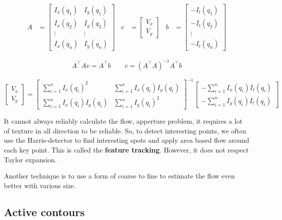 \documentclass[
  a4paper,
  ,captions=tableheading
]{scrartcl}
\begin{document}
\begin{align}
    A &= \begin{bmatrix}
        I_x(q_1) & I_y(q_1)\\
        I_x(q_2) & I_y(q_2)\\
        \vdots & \vdots\\
        I_x(q_n) & I_y(q_n)
    \end{bmatrix} & v&= \begin{bmatrix}
        V_x\\ V_y
    \end{bmatrix} & b&=\begin{bmatrix}
        -I_t(q_1)\\
        -I_t(q_2)\\
        \vdots\\
        -I_t(q_n)
    \end{bmatrix}
\end{align}

\[
A^\top A v = A^\top b \qquad v = (A^\top A)^{-1} A^\top b
\]

\[
\begin{bmatrix}
    V_x\\
    V_y
\end{bmatrix} = \begin{bmatrix}
    \sum_{i=1}^n I_x(q_i)^2 & \sum_{i=1}^n I_x(q_i) I_y(q_i)\\
    \sum_{i=1}^n I_x(q_i) I_y(q_i) & \sum_{i=1}^n I_y(q_i)^2
\end{bmatrix}^{-1} \begin{bmatrix}
    -\sum_{i=1}^n I_x(q_i) I_t(q_i)\\
    -\sum_{i=1}^n I_y(q_i) I_t(q_i)
\end{bmatrix}
\]

It cannot always reliably calculate the flow, apperture problem, it
requires a lot of texture in all direction to be reliable. So, to detect
interesting points, we often use the Harris-detector to find interesting
spots and apply area based flow around each key point. This is called
the \textbf{feature tracking}. However, it does not respect Taylor
expansion.

Another technique is to use a form of coarse to fine to estimate the
flow even better with various size.

\subsection{Active contours}\label{active-contours}
\end{document}
